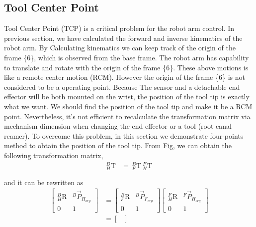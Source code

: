 \documentclass[12pt]{article}
\begin{document}
\begin{CJK}{UTF8}{bsmi}
\section{Tool Center Point}
Tool Center Point (TCP) is a critical problem for the robot arm control. In previous section, we have calculated the forward and inverse kinematics of the robot arm. By Calculating kinematics we can keep track of the origin of the frame \{6\}, which is observed from the base frame. The robot arm has capability to translate and rotate with the origin of the frame \{6\}. These above motions is like a remote center motion (RCM). However the origin of the frame \{6\} is not considered to be a operating point. Because The sensor and a detachable end effector will be both mounted on the wrist, the position of the tool tip is exactly what we want. We should find the position of the tool tip and make it be a RCM point. Nevertheless, it's not efficient to recalculate the transformation matrix via mechanism dimension when changing the end effector or a tool (root canal reamer). To overcome this problem, in this section we demonstrate four-points method to obtain the position of the tool tip.
From Fig, we can obtain the following transformation matrix,
\begin{equation}
\begin{split}
_{H}^{B}\textrm{T} &=\  _{F}^{B}\textrm{T}\ _{H}^{F}\textrm{T}\\\\
\end{split}
\end{equation}		
and it can be rewritten as
\begin{equation}
\begin{split}																												
\begin{bmatrix}
_{H}^{B}\textrm{R} & ^{B}\vec{P}_{H_{org}}\\ 
0 & 1
\end{bmatrix} &=
\begin{bmatrix}
_{F}^{B}\textrm{R} & ^{B}\vec{P}_{F_{org}}\\ 
0 & 1
\end{bmatrix}
\begin{bmatrix}
_{H}^{F}\textrm{R} & ^{F}\vec{P}_{H_{org}}\\ 
0 & 1
\end{bmatrix}\\
&= 
\begin{bmatrix}

\end{bmatrix}
\end{split}
\end{equation}
\end{CJK}
\end{document}
